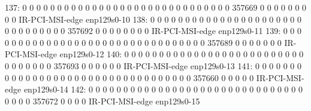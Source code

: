  137:          0          0          0          0          0          0          0          0          0          0          0          0          0          0          0          0          0          0          0          0          0          0          0          0          0          0          0          0          0          0     357669          0          0          0          0          0          0          0          0          0  IR-PCI-MSI-edge      enp129s0-10
 138:          0          0          0          0          0          0          0          0          0          0          0          0          0          0          0          0          0          0          0          0          0          0          0          0          0          0          0          0          0          0          0     357692          0          0          0          0          0          0          0          0  IR-PCI-MSI-edge      enp129s0-11
 139:          0          0          0          0          0          0          0          0          0          0          0          0          0          0          0          0          0          0          0          0          0          0          0          0          0          0          0          0          0          0          0          0     357689          0          0          0          0          0          0          0  IR-PCI-MSI-edge      enp129s0-12
 140:          0          0          0          0          0          0          0          0          0          0          0          0          0          0          0          0          0          0          0          0          0          0          0          0          0          0          0          0          0          0          0          0          0     357693          0          0          0          0          0          0  IR-PCI-MSI-edge      enp129s0-13
 141:          0          0          0          0          0          0          0          0          0          0          0          0          0          0          0          0          0          0          0          0          0          0          0          0          0          0          0          0          0          0          0          0          0          0     357660          0          0          0          0          0  IR-PCI-MSI-edge      enp129s0-14
 142:          0          0          0          0          0          0          0          0          0          0          0          0          0          0          0          0          0          0          0          0          0          0          0          0          0          0          0          0          0          0          0          0          0          0          0     357672          0          0          0          0  IR-PCI-MSI-edge      enp129s0-15
